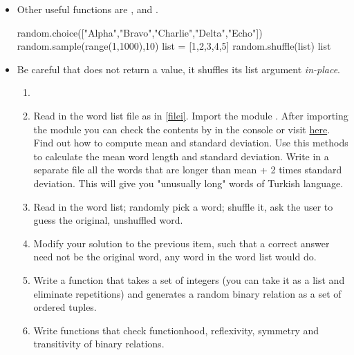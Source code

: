 \documentclass[a4paper]{article}
\begin{document}
{\begin{itemize}
\item Other useful functions are ,  and
.

\begin{ucodeframe}
\begin{pyconsole}
random.choice(["Alpha","Bravo","Charlie","Delta","Echo"])
random.sample(range(1,1000),10)
list = [1,2,3,4,5]
random.shuffle(list)
list
\end{pyconsole}
\end{ucodeframe}

\item Be careful that  does not return a value, it shuffles its
list argument \emph{in-place}.

\begin{uexercise} \begin{enumerate} \item[] \item Read in the word list file as
in \ref{filei}. Import the module .  After importing the module
you can check the contents by  in the console or visit
\href{https://docs.python.org/3/library/statistics.html}{here}. Find out how to
compute mean and standard deviation. Use this methods to calculate the mean word
length and standard deviation. Write in a separate file all the words that are
longer than mean + 2 times standard deviation. This will give you "unusually
long" words of Turkish language.

\item
Read in the word list; randomly pick a word; shuffle it, ask the user to guess
the original, unshuffled word. 

\item
Modify your solution to the previous item, such that a correct answer need
not be the original word, any word in the word list would do.

\item Write a function that takes a set of integers (you can take it as a list
and eliminate repetitions) and generates a random binary relation as a set of
ordered tuples. 
\item Write functions that check functionhood, reflexivity, symmetry and
transitivity of binary relations.

\end{enumerate}
\end{uexercise}

\end{itemize}


}
\end{document}
